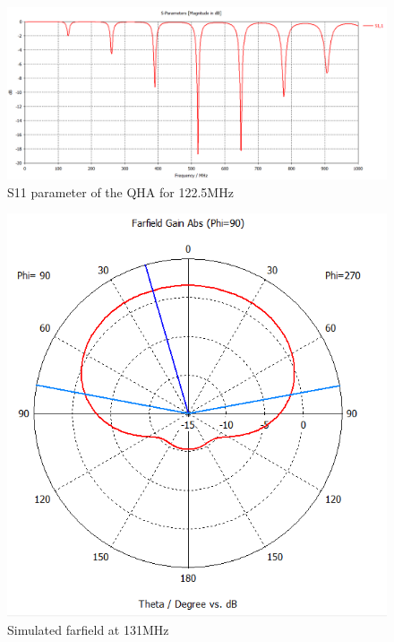 \begin{figure}[H]
\centering 
\includegraphics[scale = 0.5]{figures/antennas/qha/qha_6_S11}
\caption{S11 parameter of the QHA for 122.5MHz}
\label{fig:QHA_S11}
\end{figure}

\begin{figure}[H]
\centering 
\includegraphics[scale = 0.5]{figures/antennas/qha/qha_6_ff_131}
\caption{Simulated farfield at 131MHz}
\label{fig:QHA_ff_131}
\end{figure}

